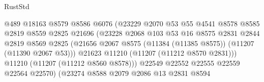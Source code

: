 \begin{lexlean}{RustStd}
\begin{coremodule}
                                          @489
                                          @18163
                                          @8579
                                          @8586
                                          @6076
                                          (@23229
                                            @2070
                                            @53
                                            @55
                                            @4541
                                            @8578
                                            @8585
                                            @2819
                                            @8559
                                            @2825
                                            @21696
                                            (@23228
                                              @2068
                                              @103
                                              @53
                                              @16
                                              @8575
                                              @2831
                                              @2844
                                              @2819
                                              @8569
                                              @2825
                                              (@21656
                                                @2067
                                                @8575
                                                (@11384 (@11385 @8575))
                                                (@11207 (@11390 @2067 @53)))
                                              @21623
                                              @11210
                                              (@11207 (@11212 @8570 @2831)))
                                            @11210
                                            (@11207 (@11212 @8560 @8578)))
                                          @22549
                                          @22552
                                          @22555
                                          @22559
                                          @22564
                                          @22570)
                                        (@23274
                                          @8588
                                          @2079
                                          @2086
                                          @13
                                          @2831
                                          @8594

\end{coremodule}
\end{lexlean}
